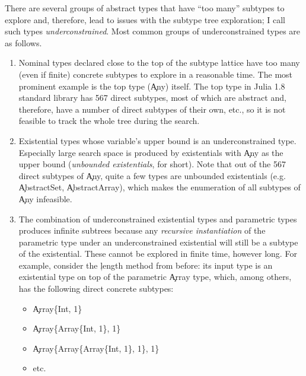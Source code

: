 There are several groups of abstract types that have ``too many'' subtypes to explore
and, therefore, lead to issues with the subtype tree exploration; I call such
types \emph{underconstrained}. Most common groups of underconstrained types are
as follows.
\begin{enumerate}

  \item Nominal types declared close to the top of the subtype lattice
    have too many (even if finite) concrete subtypes to explore in a reasonable time.
    The most prominent example is the top type (\c{Any}) itself.
    The top type in Julia 1.8 standard library has 567 direct subtypes, most of
    which are abstract and, therefore, have a number of direct subtypes of
    their own, etc., so it is not feasible to track the whole tree during the search.

  \item Existential types whose variable's upper bound is an underconstrained
    type. Especially large search space is produced by existentials with \c{Any}
    as the upper bound (\emph{unbounded existentials}, for short).
    Note that out of the 567 direct subtypes of \c{Any},
    quite a few types are unbounded existentials (e.g. \c{AbstractSet},
    \c{AbstractArray}), which makes the enumeration of all subtypes of \c{Any}
    infeasible.


  \item The combination of underconstrained existential types and parametric
    types produces infinite subtrees because any \emph{recursive instantiation}
    of the parametric type under an underconstrained existential will still be a
    subtype of the existential. These cannot be explored in finite time, however
    long. For example, consider the \c{length} method from before: its input
    type is an existential type on top of the parametric \c{Array} type,
    which, among others, has the following direct concrete subtypes:
    \begin{itemize}
      \item \c{Array\{Int, 1\}}
      \item \c{Array\{Array\{Int, 1\}, 1\}}
      \item \c{Array\{Array\{Array\{Int, 1\}, 1\}, 1\}}
      \item etc.
    \end{itemize}

\end{enumerate}

